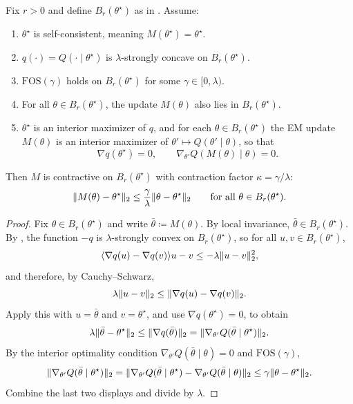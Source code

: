 \documentclass[11pt]{article}
\begin{document}
\begin{theorem}
\label{thm:em-fos-implies-contraction}
Fix $r>0$ and define $B_r(\theta^\star)$ as in .
Assume:
\begin{enumerate}[leftmargin=*]
  \item $\theta^\star$ is self-consistent, meaning $M(\theta^\star)=\theta^\star$.
  \item $q(\cdot)=Q(\cdot\mid\theta^\star)$ is $\lambda$-strongly concave on $B_r(\theta^\star)$.
  \item $\mathrm{FOS}(\gamma)$ holds on $B_r(\theta^\star)$ for some $\gamma\in[0,\lambda)$.
  \item For all $\theta\in B_r(\theta^\star)$, the update $M(\theta)$ also lies in $B_r(\theta^\star)$.
  \item $\theta^\star$ is an interior maximizer of $q$, and for each $\theta\in B_r(\theta^\star)$ the EM update $M(\theta)$ is an interior maximizer of $\theta'\mapsto Q(\theta'\mid\theta)$, so that
  \[
  \nabla q(\theta^\star)=0,
  \qquad
  \nabla_{\theta'} Q(M(\theta)\mid\theta)=0.
  \]
\end{enumerate}
Then $M$ is contractive on $B_r(\theta^\star)$ with contraction factor $\kappa=\gamma/\lambda$:
\[
\lVert M(\theta)-\theta^\star\rVert_2
\le
\frac{\gamma}{\lambda}\lVert\theta-\theta^\star\rVert_2
\qquad\text{for all }\theta\in B_r(\theta^\star).
\]
\end{theorem}

\begin{proof}
Fix $\theta\in B_r(\theta^\star)$ and write $\bar\theta \coloneqq M(\theta)$.
By local invariance, $\bar\theta\in B_r(\theta^\star)$.
By , the function $-q$ is $\lambda$-strongly convex on $B_r(\theta^\star)$, so for all $u,v\in B_r(\theta^\star)$,
\[
\langle\nabla q(u)-\nabla q(v)\rangle{u-v}
\le
-\lambda\lVert u-v\rVert_2^2,
\]
and therefore, by Cauchy--Schwarz,
\[
\lambda\lVert u-v\rVert_2
\le
\lVert\nabla q(u)-\nabla q(v)\rVert_2.
\]
Apply this with $u=\bar\theta$ and $v=\theta^\star$, and use $\nabla q(\theta^\star)=0$, to obtain
\[
\lambda\lVert\bar\theta-\theta^\star\rVert_2
\le
\lVert\nabla q(\bar\theta)\rVert_2
=
\lVert\nabla_{\theta'} Q(\bar\theta\mid\theta^\star)\rVert_2.
\]
By the interior optimality condition $\nabla_{\theta'} Q(\bar\theta\mid\theta)=0$ and $\mathrm{FOS}(\gamma)$,
\[
\lVert\nabla_{\theta'} Q(\bar\theta\mid\theta^\star)\rVert_2
=
\lVert\nabla_{\theta'} Q(\bar\theta\mid\theta^\star)-\nabla_{\theta'} Q(\bar\theta\mid\theta)\rVert_2
\le
\gamma\lVert\theta-\theta^\star\rVert_2.
\]
Combine the last two displays and divide by $\lambda$.
\end{proof}
\end{document}
